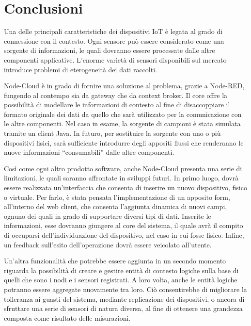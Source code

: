 \documentclass{article}
\begin{document}
\section{Conclusioni}
Una delle principali caratteristiche dei dispositivi IoT è legata al grado di connessione con il contesto. Ogni sensore può essere considerato come una sorgente di informazioni, le quali dovranno essere processate dalle altre componenti applicative. L’enorme varietà di sensori disponibili sul mercato introduce problemi di eterogeneità dei dati raccolti.\newline

Node-Cloud è in grado di fornire una soluzione al problema, grazie a Node-RED, fungendo al contempo sia da gateway che da context broker. Il core offre la possibilità di modellare le informazioni di contesto al fine di disaccoppiare il formato originale dei dati da quello che sarà utilizzato per la comunicazione con le altre componenti. Nel caso in esame, la sorgente di campioni è stata simulata tramite un client Java. In futuro, per sostituire la sorgente con uno o più dispositivi fisici, sarà sufficiente introdurre degli appositi flussi che renderanno le nuove informazioni “consumabili” dalle altre componenti.\newline

Così come ogni altro prodotto software, anche Node-Cloud presenta una serie di limitazioni, le quali saranno affrontate in sviluppi futuri. In primo luogo, dovrà essere realizzata un’interfaccia che consenta di inserire un nuovo dispositivo, fisico o virtuale. Per farlo, è stata pensata l’implementazione di un apposito form, all’interno del web client, che consenta l’aggiunta dinamica di nuovi campi, ognuno dei quali in grado di supportare diversi tipi di dati. Inserite le informazioni, esse dovranno giungere al core del sistema, il quale avrà il compito di occuparsi dell’individuazione del dispositivo, nel caso in cui fosse fisico. Infine, un feedback sull’esito dell’operazione dovrà essere veicolato all’utente.\newline 

Un’altra funzionalità che potrebbe essere aggiunta in un secondo momento riguarda la possibilità di creare e gestire entità di contesto logiche sulla base di quelli che sono i nodi e i sensori registrati. A loro volta, anche le entità logiche potranno essere aggregate nuovamente tra loro. Ciò consentirebbe di migliorare la tolleranza ai guasti del sistema, mediante replicazione dei dispositivi, o ancora di sfruttare una serie di sensori di natura diversa, al fine di ottenere una grandezza composta come risultato delle misurazioni.
\end{document}
